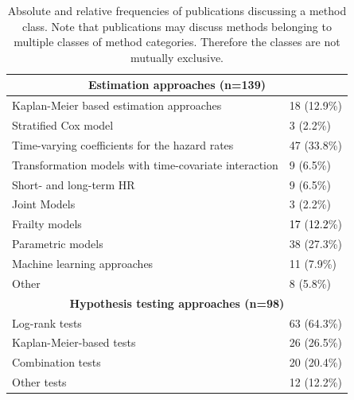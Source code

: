 \documentclass{article}
\newcommand{\NEW}[2][black]{\textcolor{#1}{#2}}
\begin{document}
\begin{table}[h]

    \caption{Absolute and relative frequencies of publications discussing a method class. Note that publications may discuss methods belonging to multiple classes of method categories. Therefore the classes are not mutually exclusive.}
    \label{tab:methodclass}
    \centering
    \begin{tabular}{|p{3.4in}|p{1in}|} \hline 
\multicolumn{2}{|c|}{\textbf{Estimation approaches (n=139)}}\\
\hline
 Kaplan-Meier based estimation approaches & 18 (12.9\%) \\ \hline
 Stratified Cox model & 3 (2.2\%) \\ \hline 
 Time-varying coefficients for the hazard rates & 47 (33.8\%) \\ \hline
 Transformation models with time-covariate interaction &  9 (6.5\%) \\ \hline
 Short- and long-term HR & 9 (6.5\%) \\ \hline 
 Joint Models & 3  (2.2\%) \\ \hline
 Frailty models & \NEW{17}  (\NEW{12.2}\%) \\ \hline %
Parametric models & 38 (27.3\%) \\ \hline
 Machine learning approaches & 11 (7.9\%) \\ \hline 
 Other & 8 (5.8\%) \\ \hline \hline
\multicolumn{2}{|c|}{\textbf{Hypothesis testing approaches (n=98)}}\\
\hline
Log-rank tests & 63 (64.3\%) \\ \hline 
Kaplan-Meier-based tests & 26 (26.5\%) \\ \hline 
Combination tests & 20 (20.4\%) \\ \hline 
Other tests & 12 (12.2\%) \\ \hline 
\end{tabular}

\end{table}
\end{document}
